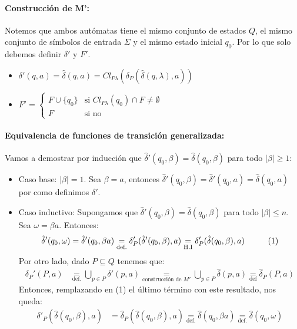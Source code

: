 \paragraph{Construcción de M':} Notemos que ambos autómatas tiene el mismo conjunto de estados \(Q\), el mismo conjunto de símbolos de entrada \(\Sigma\) y el mismo estado inicial \(q_0\). Por lo que solo debemos definir \(\delta'\) y \(F'\).
\begin{itemize}
  \item \(\delta'(q,a) = \hat\delta(q, a) = Cl_{P\lambda}\left(\delta_P(\hat\delta(q,\lambda), a)\right)\)
  \item \(
        F' = \begin{cases}
          F\cup\{q_0\} & \text{si } Cl_{P\lambda}(q_0)\cap F \neq \emptyset \\
          F            & \text{si no}
        \end{cases}\)
\end{itemize}

\paragraph{Equivalencia de funciones de transición generalizada:} Vamos a demostrar por inducción que \(\hat\delta'(q_0,\beta) = \hat\delta(q_0,\beta)\) para todo \(|\beta|\geq 1\):
\begin{itemize}
  \item Caso base: \(|\beta|=1\). Sea \(\beta = a\), entonces \(\hat\delta'(q_0,\beta) = \hat\delta'(q_0, a) = \hat\delta(q_0, a)\) por como definimos \(\delta'\).
  \item Caso inductivo: Supongamos que \(\hat\delta'(q_0,\beta) = \hat\delta(q_0,\beta)\) para todo \(|\beta|\leq n\). Sea \(\omega = \beta a\). Entonces:
        \begin{align*}
          \hat\delta'(q_0,\omega) & = \hat\delta'(q_0,\beta a) \underset{\text{def.}}{=} \delta'_P(\hat\delta'(q_0,\beta), a) \underset{\text{H.I}}{=} \delta'_P  (\hat\delta(q_0,\beta), a)\hspace*{1cm}(1) \\
        \end{align*}
        Por otro lado, dado \(P \subseteq Q\) tenemos que:
        \begin{align*}
          \delta_P'(P, a) & \underset{\text{def.}}{=} \bigcup_{p\in P} \delta'(p, a) \underset{\text{construcción de } M'}{=} \bigcup_{p\in P} \hat\delta(p, a)\underset{\text{def}}{=} \hat\delta_P(P,a)
        \end{align*}
        Entonces, remplazando en (1) el último término con este resultado, nos queda:
        \begin{align*}
          \delta'_P(\hat\delta(q_0,\beta), a) & = \hat\delta_P(\hat\delta(q_0,\beta), a) \underset{\text{def.}}{=} \hat\delta(q_0,\beta a) \underset{\text{def.}}{=} \hat\delta(q_0,\omega)
        \end{align*}
\end{itemize}

